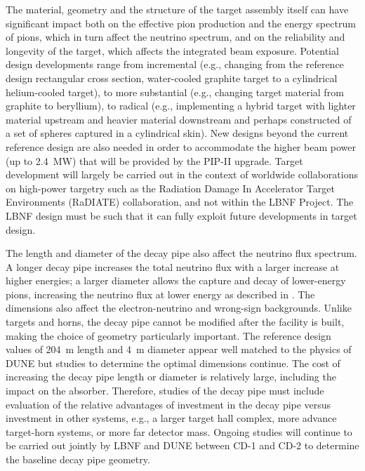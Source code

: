 The material, geometry and the structure of the target assembly itself can have significant impact both on the effective pion production and the energy spectrum of pions, which in turn affect the neutrino spectrum, and on the reliability and longevity of 
the target, which affects the integrated beam exposure.  Potential design developments range from incremental (e.g., changing from the reference design rectangular cross section, water-cooled graphite target to a cylindrical 
helium-cooled target), to more substantial (e.g., changing target material from graphite to beryllium), to radical (e.g., implementing a hybrid target with lighter material upstream and heavier material downstream and perhaps constructed of a set of spheres captured in a 
cylindrical skin).  New designs beyond the current reference design are also needed in order to accommodate the higher beam power (up to 2.4~MW) that will be provided by the PIP-II upgrade.  Target development will largely be carried out in the 
context of worldwide collaborations on high-power targetry such as the Radiation Damage In Accelerator Target 
Environments (RaDIATE) collaboration, and not within the LBNF Project. The LBNF design must be such that it can fully exploit future developments in target design.
 
The length and diameter of the decay pipe also affect the neutrino flux spectrum.  A longer decay pipe increases the total neutrino flux with a larger increase at higher energies; a larger diameter allows the capture and decay of lower-energy pions, 
increasing the neutrino flux at lower energy as described in \volphys. The dimensions also affect the electron-neutrino and wrong-sign backgrounds.  Unlike targets and horns, the decay pipe cannot be modified after the facility is built, making the 
choice of geometry particularly important.  The reference design values of \SI{204}{\meter} length and \SI{4}{\meter} diameter appear well matched to the physics of DUNE but studies to determine the optimal dimensions continue.  The cost of increasing the decay 
pipe length or diameter  is relatively large, including 
the impact on the absorber.
Therefore, studies of the decay pipe must include 
evaluation of the relative advantages of
investment in the decay pipe versus investment in 
other systems, e.g., a larger target hall complex, more advance target-horn systems, or more far detector mass.  Ongoing studies will continue to be carried out jointly by LBNF and DUNE between CD-1 and CD-2 to determine the baseline decay pipe geometry.
